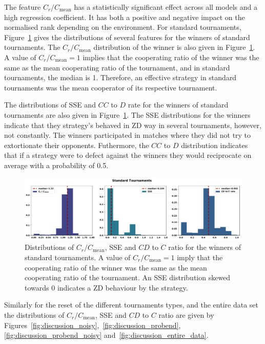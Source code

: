 \documentclass{article}
\begin{document}
The feature \(C_{r} / C_{\text{mean}}\) has a statistically significant effect
across all models and a high regression coefficient. It has both a positive and
negative impact on the normalised rank depending on the environment. For
standard tournaments, Figure~\ref{fig:discussion_standard} gives the
distributions of several features for the winners of standard tournaments. The
\(C_{r} / C_{\text{mean}}\) distribution of the winner is also given in
Figure~\ref{fig:discussion_standard}. A value of \(C_r / C_{\text{mean}} = 1\)
implies that the cooperating ratio of the winner was the same as the mean
cooperating ratio of the tournament, and in standard tournaments, the median is
1. Therefore, an effective strategy in standard tournaments was the mean
cooperator of its respective tournament.

The distributions of SSE and \(CC\) to \(D\) rate for the winners of standard
tournaments are also given in Figure~\ref{fig:discussion_standard}. The SSE
distributions for the winners indicate that they strategy's behaved in ZD way in
several tournaments, however, not constantly. The winners participated in
matches where they did not try to extortionate their opponents. Futhermore, the
\(CC\) to \(D\) distribution indicates that if a strategy were to defect against
the winners they would reciprocate on average with a probability of 0.5.

\begin{figure}[!htbp]
    \centering
        \centering
        \includegraphics[width=\textwidth]{../images/standard_discussion.pdf}
        \caption{Distributions of \(C_r / C_{\text{mean}}\), SSE and \(CD\) to \(C\) ratio
        for the winners of standard tournaments. A
        value of \(C_r / C_{\text{mean}} = 1\) imply that the cooperating ratio of the
        winner was the same as the mean cooperating ratio of the tournament. An SSE distribution
        skewed towards 0 indicates a ZD behaviour by the strategy.}
        \label{fig:discussion_standard}
\end{figure}

Similarly for the reset of the different tournaments types, and the entire data
set the distributions of \(C_r / C_{\text{mean}}\), SSE and \(CD\) to \(C\) ratio
are given by Figures~\ref{fig:discussion_noisy},~\ref{fig:discussion_probend},
\ref{fig:discussion_probend_noisy} and~\ref{fig:discussion_entire_data}.
\end{document}
